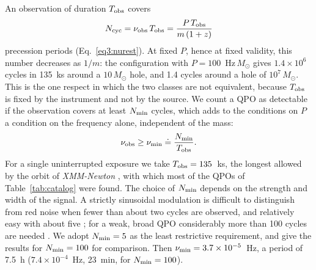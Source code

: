 An observation of duration $T_\textup{obs}$ covers
\begin{equation}
    \label{eq5:Ncyc}
    N_\textup{cyc}=\nu_\textup{obs}\,T_\textup{obs}=\frac{P\,T_\textup{obs}}{m\,(1+z)}
\end{equation}
precession periods (Eq.~\ref{eq3:nurest}).
At fixed $P$, hence at fixed validity, this number decreases as $1/m$: the configuration with $P=100$~Hz\,$M_\odot$ gives $1.4\times10^6$ cycles in 135~ks around a $10\,M_\odot$ hole, and 1.4 cycles around a hole of $10^7\,M_\odot$.
This is the one respect in which the two classes are not equivalent, because $T_\textup{obs}$ is fixed by the instrument and not by the source.
We count a QPO as detectable if the observation covers at least $N_\textup{min}$ cycles, which adds to the conditions on $P$ a condition on the frequency alone, independent of the mass:
\begin{equation}
    \label{eq5:numin}
    \nu_\textup{obs}\geq\nu_\textup{min}\doteq\frac{N_\textup{min}}{T_\textup{obs}} .
\end{equation}
For a single uninterrupted exposure we take $T_\textup{obs}=135$~ks, the longest allowed by the orbit of \textit{XMM-Newton} \citep{XMMUHB}, with which most of the QPOs of Table~\ref{tab:catalog} were found.
The choice of $N_\textup{min}$ depends on the strength and width of the signal.
A strictly sinusoidal modulation is difficult to distinguish from red noise when fewer than about two cycles are observed, and relatively easy with about five \citep{Vaughan2016}; for a weak, broad QPO considerably more than 100 cycles are needed \citep{VaughanUttley2005}.
We adopt $N_\textup{min}=5$ as the least restrictive requirement, and give the results for $N_\textup{min}=100$ for comparison.
Then $\nu_\textup{min}=3.7\times10^{-5}$~Hz, a period of 7.5~h ($7.4\times10^{-4}$~Hz, 23~min, for $N_\textup{min}=100$).

